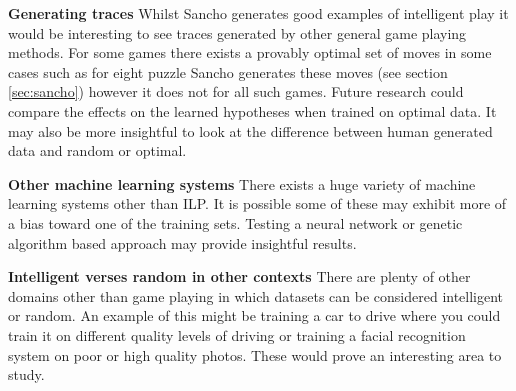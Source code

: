 \textbf{Generating traces} Whilst Sancho generates good examples of intelligent play it would be interesting to see traces generated by other general game playing methods\cite{Park/GGPAdvances,Kowalski/GGP}. For some games there exists a provably optimal set of moves in some cases such as for eight puzzle Sancho generates these moves (see section \ref{sec:sancho}) however it does not for all such games\cite{Schaeffer/Checkers}. Future research could compare the effects on the learned hypotheses when trained on optimal data. It may also be more insightful to look at the difference between human generated data and random or optimal.

\textbf{Other machine learning systems} There exists a huge variety of machine learning systems other than ILP. It is possible some of these may exhibit more of a bias toward one of the training sets. Testing a neural network or genetic algorithm based approach may provide insightful results.

\textbf{Intelligent verses random in other contexts} There are plenty of other domains other than game playing in which datasets can be considered intelligent or random. An example of this might be training a car to drive where you could train it on different quality levels of driving or training a facial recognition system on poor or high quality photos. These would prove an interesting area to study.


